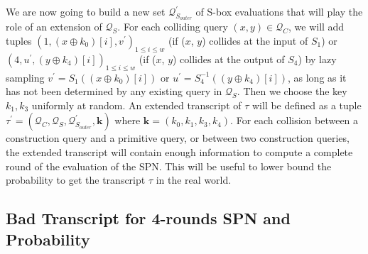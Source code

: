 We are now going to build a new set $\mathcal{Q}_{S_{outer}}^{\prime}$ of S-box evaluations that will play the role of an extension of $\mathcal{Q}_{S}$. For each colliding query $(x, y) \in \mathcal{Q}_{C}$, we will add tuples $\left(1, \left(x \oplus k_{0}\right)[i], v^{\prime}\right)_{1 \leq i \leq w}$ (if ($\mathit{x}$, $\mathit{y}$) collides at the input of $S_1$) or $\left(4, u^{\prime}, \left(y \oplus k_{4}\right)[i]\right)_{1 \leq i \leq w}$ (if ($\mathit{x}$, $\mathit{y}$) collides at the output of $S_4$) by lazy sampling $v^{\prime}=S_{1}(\left(x \oplus k_{0}\right)[i])$ or $u^{\prime}=S_{4}^{-1}(\left(y \oplus k_{4}\right)[i])$, as long as it has not been determined by any existing query in $\mathcal{Q}_{S}$. Then we choose the key $k_1,k_3$ uniformly at random. An extended transcript of $\tau$ will be defined as a tuple $\tau^{\prime}=\left(\mathcal{Q}_{C}, \mathcal{Q}_{S}, \mathcal{Q}_{S_{outer}}^{\prime}, \mathbf{k}\right)$ where $\mathbf{k}=\left(k_{0}, k_{1},k_{3},k_{4}\right)$. For each collision between a construction query and a primitive query, or between two construction queries, the extended transcript will contain enough information to compute a complete round of the evaluation of the SPN. This will be useful to lower bound the probability to get the transcript $\tau$ in the real world.





\subsection{Bad Transcript for 4-rounds SPN and Probability}
\label{sec:bad-tau-4-rounds}

